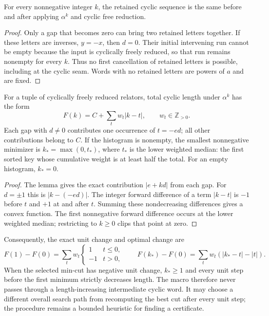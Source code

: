 \begin{lemma}
For every nonnegative integer $k$, the retained cyclic sequence is the same
before and after applying $\alpha^k$ and cyclic free reduction.
\end{lemma}
\begin{proof}
Only a gap that becomes zero can bring two retained letters together.
If these letters are inverses, $y=-x$, then $d=0$. Their initial intervening
run cannot be empty because the input is cyclically freely reduced, so
that run remains nonempty for every $k$. Thus no first cancellation of
retained letters is possible, including at the cyclic seam. Words with
no retained letters are powers of $a$ and are fixed.
\end{proof}

\begin{proposition}
For a tuple of cyclically freely reduced relators, total cyclic length
under $\alpha^k$ has the form
\[
 F(k)=C+\sum_t w_t|k-t|,\qquad w_t\in\mathbb Z_{>0}.
\]
Each gap with $d\ne0$ contributes one occurrence of $t=-ed$;
all other contributions belong to $C$. If the histogram is nonempty,
the smallest nonnegative minimizer is $k_* =\max(0,t_*)$, where $t_*$ is
the lower weighted median: the first sorted key whose cumulative weight
is at least half the total. For an empty histogram, $k_*=0$.
\end{proposition}
\begin{proof}
The lemma gives the exact contribution $|e+kd|$ from each gap. For
$d=\pm1$ this is $|k-(-ed)|$. The integer forward difference of a term
$|k-t|$ is $-1$ before $t$ and $+1$ at and after $t$. Summing these
nondecreasing differences gives a convex function. The first nonnegative
forward difference occurs at the lower weighted median; restricting to
$k\ge0$ clips that point at zero.
\end{proof}

Consequently, the exact unit change and optimal change are
\[
 F(1)-F(0)=\sum_t w_t\begin{cases}1&t\le0,\\-1&t>0,\end{cases}
 \qquad
 F(k_*)-F(0)=\sum_t w_t(|k_*-t|-|t|).
\]
When the selected min-cut has negative unit change, $k_*\ge1$ and every
unit step before the first minimum strictly decreases length. The macro
therefore never passes through a length-increasing intermediate cyclic
word. It may choose a different overall search path from recomputing the
best cut after every unit step; the procedure remains a bounded heuristic
for finding a certificate.

